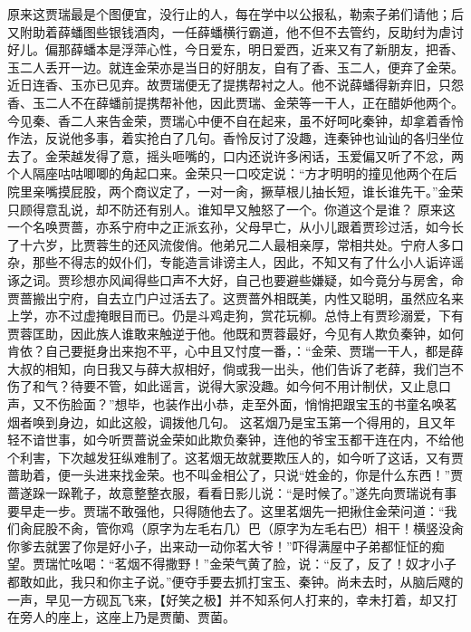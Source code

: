 \documentclass[12pt,oneside]{book}
\begin{document}
原来这贾瑞最是个图便宜，没行止的人，每在学中以公报私，勒索子弟们请他；后又附助着薛蟠图些银钱酒肉，一任薛蟠横行霸道，他不但不去管约，反助纣为虐讨好儿。偏那薛蟠本是浮萍心性，今日爱东，明日爱西，近来又有了新朋友，把香、玉二人丢开一边。就连金荣亦是当日的好朋友，自有了香、玉二人，便弃了金荣。近日连香、玉亦已见弃。故贾瑞便无了提携帮衬之人。他不说薛蟠得新弃旧，只怨香、玉二人不在薛蟠前提携帮补他，因此贾瑞、金荣等一干人，正在醋妒他两个。今见秦、香二人来告金荣，贾瑞心中便不自在起来，虽不好呵叱秦钟，却拿着香怜作法，反说他多事，着实抢白了几句。香怜反讨了没趣，连秦钟也讪讪的各归坐位去了。金荣越发得了意，摇头咂嘴的，口内还说许多闲话，玉爱偏又听了不忿，两个人隔座咕咕唧唧的角起口来。金荣只一口咬定说：“方才明明的撞见他两个在后院里亲嘴摸屁股，两个商议定了，一对一肏，撅草根儿抽长短，谁长谁先干。”金荣只顾得意乱说，却不防还有别人。谁知早又触怒了一个。你道这个是谁？
原来这一个名唤贾蔷，亦系宁府中之正派玄孙，父母早亡，从小儿跟着贾珍过活，如今长了十六岁，比贾蓉生的还风流俊俏。他弟兄二人最相亲厚，常相共处。宁府人多口杂，那些不得志的奴仆们，专能造言诽谤主人，因此，不知又有了什么小人诟谇谣诼之词。贾珍想亦风闻得些口声不大好，自己也要避些嫌疑，如今竟分与房舍，命贾蔷搬出宁府，自去立门户过活去了。这贾蔷外相既美，内性又聪明，虽然应名来上学，亦不过虚掩眼目而已。仍是斗鸡走狗，赏花玩柳。总恃上有贾珍溺爱，下有贾蓉匡助，因此族人谁敢来触逆于他。他既和贾蓉最好，今见有人欺负秦钟，如何肯依？自己要挺身出来抱不平，心中且又忖度一番，：“金荣、贾瑞一干人，都是薛大叔的相知，向日我又与薛大叔相好，倘或我一出头，他们告诉了老薛，我们岂不伤了和气？待要不管，如此谣言，说得大家没趣。如今何不用计制伏，又止息口声，又不伤脸面？”想毕，也装作出小恭，走至外面，悄悄把跟宝玉的书童名唤茗烟者唤到身边，如此这般，调拨他几句。
这茗烟乃是宝玉第一个得用的，且又年轻不谙世事，如今听贾蔷说金荣如此欺负秦钟，连他的爷宝玉都干连在内，不给他个利害，下次越发狂纵难制了。这茗烟无故就要欺压人的，如今听了这话，又有贾蔷助着，便一头进来找金荣。也不叫金相公了，只说“姓金的，你是什么东西！”贾蔷遂跺一跺靴子，故意整整衣服，看看日影儿说：“是时候了。”遂先向贾瑞说有事要早走一步。贾瑞不敢强他，只得随他去了。这里茗烟先一把揪住金荣问道：“我们肏屁股不肏，管你鸡（原字为左毛右几）巴（原字为左毛右巴）相干！横竖没肏你爹去就罢了你是好小子，出来动一动你茗大爷！”吓得满屋中子弟都怔怔的痴望。贾瑞忙吆喝：“茗烟不得撒野！”金荣气黄了脸，说：“反了，反了！奴才小子都敢如此，我只和你主子说。”便夺手要去抓打宝玉、秦钟。尚未去时，从脑后飕的一声，早见一方砚瓦飞来，【好笑之极】并不知系何人打来的，幸未打着，却又打在旁人的座上，这座上乃是贾蘭、贾菌。
\end{document}

